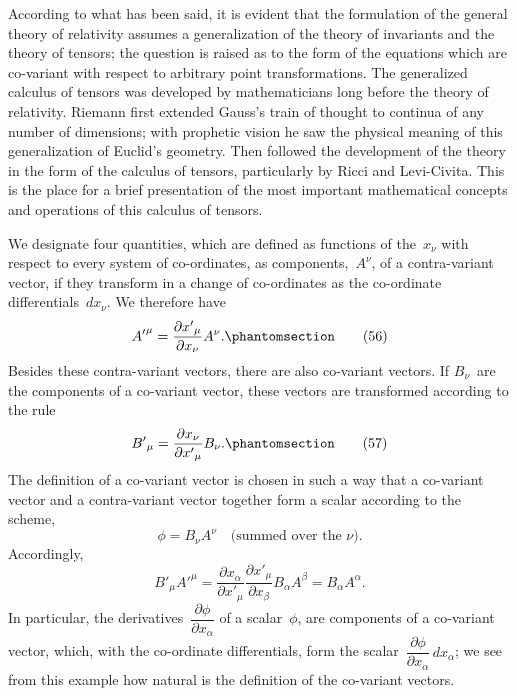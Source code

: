 \documentclass[12pt]{book}[2005/09/16]
\newcommand{\Change}[2]{#2}
\newcommand{\Add}[1]{\Change{}{#1}}
\newcommand{\PageSep}[1]{\ignorespaces}
\newcommand{\Tag}[1]{%
  \phantomsection
  \label{eqn:#1}
  \tag*{#1}
}
\newcommand{\dd}{\partial}
\begin{document}
According to what has been said, it is evident that
the formulation of the general theory of relativity
assumes a generalization of the theory of invariants and
the theory of tensors; the question is raised as to the
\PageSep{72}
%
form of the equations which are co-variant with respect
%
to arbitrary point transformations. The generalized
calculus of tensors was developed by mathematicians
long before the theory of relativity. Riemann first
%
extended Gauss's train of thought to continua of any
number of dimensions; with prophetic vision he saw
the physical meaning of this generalization of Euclid's
geometry. Then followed the development of the theory
in the form of the calculus of tensors, particularly by
Ricci and Levi-Civita. This is the place for a brief
presentation of the most important mathematical concepts
and operations of this calculus of tensors.

We designate four quantities, which are defined as
functions of the~$x_{\nu}$ with respect to every system of co-ordinates,
as components,~$A^{\nu}$, of a contra-variant vector,
%
%
if they transform in a change of co-ordinates as the co-ordinate
differentials~$dx_{\nu}$. We therefore have
\[
\Change{A^{\mu'}}{{A'}^{\mu}} = \frac{{\dd x'}_{\mu}}{\dd x_{\nu}} A^{\nu}\Add{.}
\Tag{(56)}
\]
Besides these contra-variant vectors, there are also co-variant
vectors. If $B_{\nu}$~are the components of a co-variant
vector, these vectors are transformed according to the
rule
\[
{B'}_{\mu} = \frac{\dd x_{\nu}}{{\dd \Change{x}{x'}}_{\mu}} B_{\nu}\Add{.}
\Tag{(57)}
\]
The definition of a co-variant vector is chosen in such a
%
way that a co-variant vector and a contra-variant vector
together form a scalar according to the scheme,
\[
\phi = B_{\nu} A^{\nu}\quad \text{(summed over the~$\nu$).}
\]
\PageSep{73}
Accordingly,
\[
{B'}_{\mu} \Change{A^{\mu'}}{{A'}^{\mu}}
  = \frac{\dd x_{\alpha}}{{\dd x'}_{\mu}}
    \frac{{\dd x'}_{\mu}}{\dd x_{\beta}} B_{\alpha} A^{\beta}
  = B_{\alpha} A^{\alpha}\Add{.}
\]
In particular, the derivatives~$\dfrac{\dd \phi}{\dd x_{\alpha}}$ of a scalar~$\phi$, are components
of a co-variant vector, which, with the co-ordinate
differentials, form the scalar~$\dfrac{\dd \phi}{\dd x_{\alpha}}\, dx_{\alpha}$; we see from this
example how natural is the definition of the co-variant
vectors.
\end{document}
